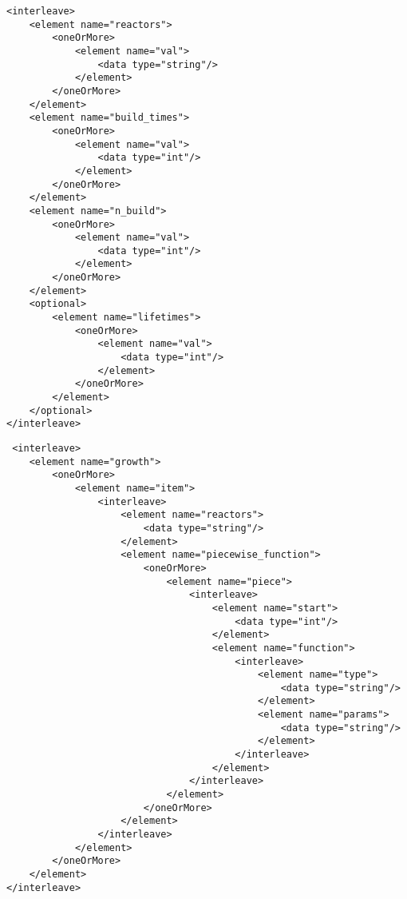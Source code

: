 \documentclass[12pt,letterpaper]{article}
\newenvironment{code}{\captionsetup{type=listing}}{}
\begin{document}
\begin{code}
\begin{verbatim}
<interleave>
    <element name="reactors">
        <oneOrMore>
            <element name="val">
                <data type="string"/>
            </element>
        </oneOrMore>
    </element>
    <element name="build_times">
        <oneOrMore>
            <element name="val">
                <data type="int"/>
            </element>
        </oneOrMore>
    </element>
    <element name="n_build">
        <oneOrMore>
            <element name="val">
                <data type="int"/>
            </element>
        </oneOrMore>
    </element>
    <optional>
        <element name="lifetimes">
            <oneOrMore>
                <element name="val">
                    <data type="int"/>
                </element>
            </oneOrMore>
        </element>
    </optional>
</interleave>
\end{verbatim}
\label{code:man_reac}
\end{code}

\begin{code}

\begin{verbatim}
 <interleave>
    <element name="growth">
        <oneOrMore>
            <element name="item">
                <interleave>
                    <element name="reactors">
                        <data type="string"/>
                    </element>
                    <element name="piecewise_function">
                        <oneOrMore>
                            <element name="piece">
                                <interleave>
                                    <element name="start">
                                        <data type="int"/>
                                    </element>
                                    <element name="function">
                                        <interleave>
                                            <element name="type">
                                                <data type="string"/>
                                            </element>
                                            <element name="params">
                                                <data type="string"/>
                                            </element>
                                        </interleave>
                                    </element>
                                </interleave>
                            </element>
                        </oneOrMore>
                    </element>
                </interleave>
            </element>
        </oneOrMore>
    </element>
</interleave>
\end{verbatim}
\label{code:fun_reac}
\end{code}
\end{document}
